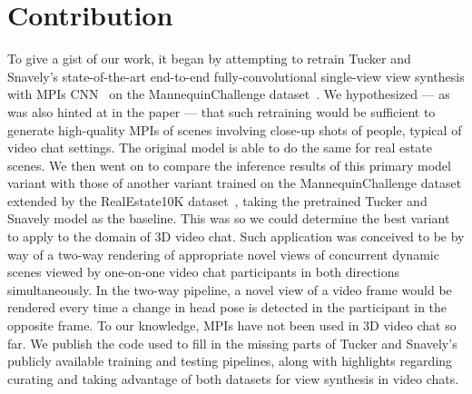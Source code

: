 \section{Contribution}\label{sec:contribution} 

To give a gist of our work, it began by attempting to retrain Tucker and Snavely's state-of-the-art end-to-end fully-convolutional single-view view synthesis with MPIs CNN~\cite{single_view_mpi} on the MannequinChallenge dataset~\cite{li2019learning}. We hypothesized --- as was also hinted at in the paper --- that such retraining would be sufficient to generate high-quality MPIs of scenes involving close-up shots of people, typical of video chat settings. The original model is able to do the same for real estate scenes. We then went on to compare the inference results of this primary model variant with those of another variant trained on the MannequinChallenge dataset extended by the RealEstate10K dataset~\cite{zhou2018stereo}, taking the pretrained Tucker and Snavely model as the baseline. This was so we could determine the best variant to apply to the domain of 3D video chat. Such application was conceived to be by way of a two-way rendering of appropriate novel views of concurrent dynamic scenes viewed by one-on-one video chat participants in both directions simultaneously. In the two-way pipeline, a novel view of a video frame would be rendered every time a change in head pose is detected in the participant in the opposite frame. To our knowledge, MPIs have not been used in 3D video chat so far. We publish the code used to fill in the missing parts of Tucker and Snavely's publicly available training and testing pipelines, along with highlights regarding curating and taking advantage of both datasets for view synthesis in video chats.

